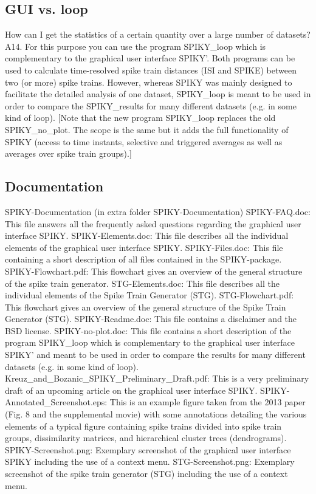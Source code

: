 \documentclass[10pt,twocolumn]{elsart5p}
\begin{document}
\subsection{\label{ss:GUI-vs-loop} GUI vs. loop} 

How can I get the statistics of a certain quantity over a large number of datasets?
A14. For this purpose you can use the program SPIKY\_loop which is complementary to the graphical user interface SPIKY'. Both programs can be used to calculate time-resolved spike train distances (ISI and SPIKE) between two (or more) spike trains. However, whereas SPIKY was mainly designed to facilitate the detailed analysis of one dataset, SPIKY\_loop is meant to be used in order to compare the SPIKY\_results for many different datasets (e.g. in some kind of loop). [Note that the new program SPIKY\_loop replaces the old SPIKY\_no\_plot. The scope is the same but it adds the full functionality of SPIKY (access to time instants, selective and triggered averages as well as averages over spike train groups).]


\subsection{\label{ss:Documentation} Documentation}

SPIKY-Documentation (in extra folder SPIKY-Documentation)
SPIKY-FAQ.doc:   This file answers all the frequently asked questions regarding the graphical user interface SPIKY. 
SPIKY-Elements.doc:   This file describes all the individual elements of the graphical user interface SPIKY.
SPIKY-Files.doc:   This file containing a short description of all files contained in the SPIKY-package.
SPIKY-Flowchart.pdf:   This flowchart gives an overview of the general structure of the spike train generator.
STG-Elements.doc:   This file describes all the individual elements of the Spike Train Generator (STG).
STG-Flowchart.pdf:   This flowchart gives an overview of the general structure of the Spike Train Generator (STG).
SPIKY-Readme.doc:   This file contains a disclaimer and the BSD license.
SPIKY-no-plot.doc:   This file contains a short description of the program SPIKY\_loop which is complementary to the graphical user interface SPIKY' and meant to be used in order to compare the results for many different datasets (e.g. in some kind of loop).
Kreuz\_and\_Bozanic\_SPIKY\_Preliminary\_Draft.pdf:   This is a very preliminary draft of an upcoming article on the graphical user interface SPIKY.
SPIKY-Annotated\_Screenshot.eps:   This is an example figure taken from the 2013 paper (Fig. 8 and the supplemental movie) with some annotations detailing the various elements of a typical figure containing spike trains divided into spike train groups, dissimilarity matrices, and hierarchical cluster trees (dendrograms).
SPIKY-Screenshot.png:   Exemplary screenshot of the graphical user interface SPIKY including the use of a context menu.
STG-Screenshot.png:   Exemplary screenshot of the spike train generator (STG) including the use of a context menu.
\end{document}
